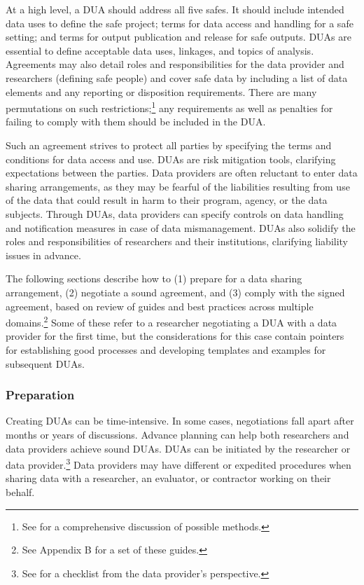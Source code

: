 \documentclass[
]{WileySix}
\begin{document}
At a high level, a DUA should address all five safes. It should include intended data uses to define the safe project; terms for data access and handling for a safe setting; and terms for output publication and release for safe outputs. DUAs are essential to define acceptable data uses, linkages, and topics of analysis. Agreements may also detail roles and responsibilities for the data provider and researchers (defining safe people) and cover safe data by including a list of data elements and any reporting or disposition requirements. There are many permutations on such restrictions;\footnote{See \citet{goroff2018} for a comprehensive discussion of possible methods.} any requirements as well as penalties for failing to comply with them should be included in the DUA.

Such an agreement strives to protect all parties by specifying the terms and conditions for data access and use. DUAs are risk mitigation tools, clarifying expectations between the parties. Data providers are often reluctant to enter data sharing arrangements, as they may be fearful of the liabilities resulting from use of the data that could result in harm to their program, agency, or the data subjects. Through DUAs, data providers can specify controls on data handling and notification measures in case of data mismanagement. DUAs also solidify the roles and responsibilities of researchers and their institutions, clarifying liability issues in advance.

The following sections describe how to (1) prepare for a data sharing arrangement, (2) negotiate a sound agreement, and (3) comply with the signed agreement, based on review of guides and best practices across multiple domains.\footnote{See Appendix B for a set of these guides.} Some of these refer to a researcher negotiating a DUA with a data provider for the first time, but the considerations for this case contain pointers for establishing good processes and developing templates and examples for subsequent DUAs.

\hypertarget{preparation}{%
\subsubsection{Preparation}\label{preparation}}

Creating DUAs can be time-intensive. In some cases, negotiations fall apart after months or years of discussions. Advance planning can help both researchers and data providers achieve sound DUAs. DUAs can be initiated by the researcher or data provider.\footnote{See \citet{yates2018} for a checklist from the data provider's perspective.} Data providers may have different or expedited procedures when sharing data with a researcher, an evaluator, or contractor working on their behalf.
\end{document}
